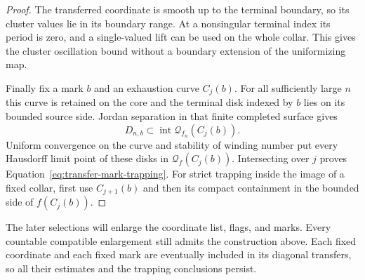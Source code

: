 \begin{proof}
The transferred coordinate is smooth up to the terminal boundary, so
its cluster values lie in its boundary range.  At a nonsingular
terminal index its period is zero, and a single-valued lift can be
used on the whole collar.  This gives the cluster oscillation bound
without a boundary extension of the uniformizing map.

Finally fix a mark $b$ and an exhaustion curve $C_j(b)$.  For all
sufficiently large $n$ this curve is retained on the core and the
terminal disk indexed by $b$ lies on its bounded source side.  Jordan
separation in that finite completed surface gives
\[
 D_{n,b}\subset\operatorname{int}\mathcal Q_{f_n}(C_j(b)).
\]
Uniform convergence on the curve and stability of winding number put
every Hausdorff limit point of these disks in
$\mathcal Q_f(C_j(b))$.  Intersecting over $j$ proves
Equation~\eqref{eq:transfer-mark-trapping}.  For strict trapping inside
the image of a fixed collar, first use $C_{j+1}(b)$ and then its
compact containment in the bounded side of $f(C_j(b))$.
\end{proof}

The later selections will enlarge the coordinate list, flags, and
marks.  Every countable compatible enlargement still admits the
construction above.  Each fixed coordinate and each fixed mark are
eventually included in its diagonal transfers, so all their estimates
and the trapping conclusions persist.
